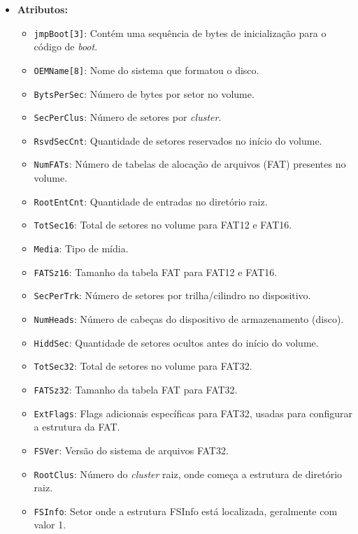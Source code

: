 \documentclass[
    12pt,				%
    oneside,   	        %
    a4paper,			%
    english,			%
    french,				%
    spanish,			%
    brazil,				%
    ]{pacotes/abntex2}
\begin{document}
\begin{itemize}
    \item \textbf{Atributos:}
        \begin{itemize}
            \item \texttt{jmpBoot[3]}: Contém uma sequência de bytes de inicialização para o código de \textit{boot}.
            \item \texttt{OEMName[8]}: Nome do sistema que formatou o disco.
            \item \texttt{BytsPerSec}: Número de bytes por setor no volume.
            \item \texttt{SecPerClus}: Número de setores por \textit{cluster}.
            \item \texttt{RsvdSecCnt}: Quantidade de setores reservados no início do volume.
            \item \texttt{NumFATs}: Número de tabelas de alocação de arquivos (FAT) presentes no volume.
            \item \texttt{RootEntCnt}: Quantidade de entradas no diretório raiz.
            \item \texttt{TotSec16}: Total de setores no volume para FAT12 e FAT16.
            \item \texttt{Media}: Tipo de mídia.
            \item \texttt{FATSz16}: Tamanho da tabela FAT para FAT12 e FAT16.
            \item \texttt{SecPerTrk}: Número de setores por trilha/cilindro no dispositivo.
            \item \texttt{NumHeads}: Número de cabeças do dispositivo de armazenamento (disco).
            \item \texttt{HiddSec}: Quantidade de setores ocultos antes do início do volume.
            \item \texttt{TotSec32}: Total de setores no volume para FAT32.
            \item \texttt{FATSz32}: Tamanho da tabela FAT para FAT32.
            \item \texttt{ExtFlags}: Flags adicionais específicas para FAT32, usadas para configurar a estrutura da FAT.
            \item \texttt{FSVer}: Versão do sistema de arquivos FAT32.
            \item \texttt{RootClus}: Número do \textit{cluster} raiz, onde começa a estrutura de diretório raiz.
            \item \texttt{FSInfo}: Setor onde a estrutura FSInfo está localizada, geralmente com valor 1.

\end{itemize}
\end{itemize}
\end{document}
